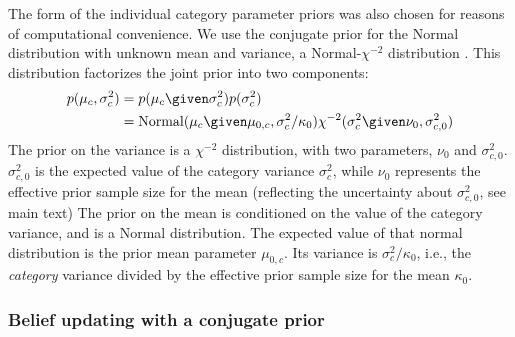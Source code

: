 The form of the individual category parameter priors was also chosen for reasons of computational convenience.  We use the conjugate prior for the Normal distribution with unknown mean and variance, a Normal-$\chi^{-2}$ distribution \autocite{Gelman2003}.  This distribution factorizes the joint prior into two components:
\begin{align}
  \label{eq:7}
  p(\mu_c, \sigma^2_c) &= p(\mu_c \given \sigma^2_c) p(\sigma^2_c)\\
  &= \mathrm{Normal} (\mu_c \given \mu_{0,c}, \sigma^2_c / \kappa_0) \chi^{-2} (\sigma^2_c \given \nu_0, \sigma^2_{c,0})
\end{align}
The prior on the variance is a $\chi^{-2}$ distribution, with two parameters, $\nu_0$ and $\sigma^2_{c,0}$.  $\sigma^2_{c,0}$  is the expected value of the category variance $\sigma^2_c$, while $\nu_0$ represents the effective prior sample size for the mean (reflecting the uncertainty about $\sigma^2_{c,0}$, see main text)%
The prior on the mean is conditioned on the value of the category variance, and is a Normal distribution. The expected value of that normal distribution is the prior mean parameter $\mu_{0,c}$. Its variance is $\sigma^2_c / \kappa_0$, i.e., the \emph{category} variance divided by the effective prior sample size for the mean $\kappa_0$.

\subsubsection{Belief updating with a conjugate prior}
\label{sec:belief-updating-with}

